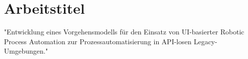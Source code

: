 \newpage
\section{Arbeitstitel}

"Entwicklung eines Vorgehensmodells für den Einsatz von UI-basierter Robotic Process Automation zur Prozessautomatisierung in API-losen Legacy-Umgebungen."


